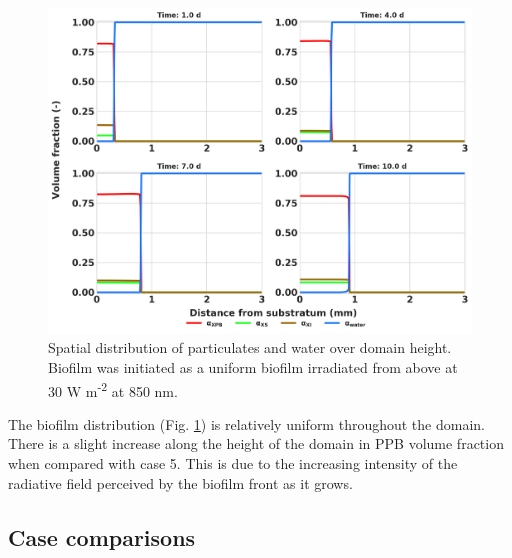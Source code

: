 \begin{figure}[H]
    \centering
    \includegraphics[width=\textwidth,height=0.45\textheight]{Chap4/methods/output/case6.png}
    \caption{Spatial distribution of particulates and water over domain height. Biofilm was initiated as a uniform biofilm irradiated from above at 30 W m\textsuperscript{-2} at 850 nm.} 
    \label{fig:case6_dist_frac}
\end{figure}

The biofilm distribution (Fig. \ref{fig:case6_dist_frac}) is relatively uniform throughout the domain. There is a slight increase along the height of the domain in PPB volume fraction when compared with case 5. This is due to the increasing intensity of the radiative field perceived by the biofilm front as it grows. 

\subsection{Case comparisons}

